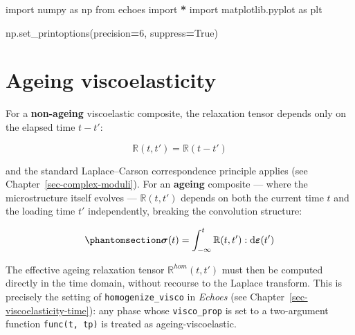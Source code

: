 \documentclass[
  a4paper,
  numbers=noendperiod,
  DIV=12]{scrreprt}
\newenvironment{Shaded}{\begin{snugshade}}{\end{snugshade}}
\newcommand{\DecValTok}[1]{\textcolor[rgb]{0.00,0.00,0.81}{#1}}
\newcommand{\ImportTok}[1]{#1}
\newcommand{\NormalTok}[1]{#1}
\newcommand{\OperatorTok}[1]{\textcolor[rgb]{0.81,0.36,0.00}{\textbf{#1}}}
\newcommand{\VariableTok}[1]{\textcolor[rgb]{0.00,0.00,0.00}{#1}}
\begin{document}
\begin{tcolorbox}[enhanced jigsaw, arc=.35mm, bottomrule=.15mm, bottomtitle=1mm, breakable, colback=white, colbacktitle=quarto-callout-tip-color!10!white, colframe=quarto-callout-tip-color-frame, coltitle=black, left=2mm, leftrule=.75mm, opacityback=0, opacitybacktitle=0.6, rightrule=.15mm, title={Imports}, titlerule=0mm, toprule=.15mm, toptitle=1mm]

\begin{Shaded}
\begin{Highlighting}[]
\ImportTok{import}\NormalTok{ numpy }\ImportTok{as}\NormalTok{ np}
\ImportTok{from}\NormalTok{ echoes }\ImportTok{import} \OperatorTok{*}
\ImportTok{import}\NormalTok{ matplotlib.pyplot }\ImportTok{as}\NormalTok{ plt}

\NormalTok{np.set\_printoptions(precision}\OperatorTok{=}\DecValTok{6}\NormalTok{, suppress}\OperatorTok{=}\VariableTok{True}\NormalTok{)}
\end{Highlighting}
\end{Shaded}

\end{tcolorbox}

\section{Ageing viscoelasticity}\label{sec-ageing-visco}

For a \textbf{non-ageing} viscoelastic composite, the relaxation tensor
depends only on the elapsed time \(t - t'\):

\[\mathbb{R}(t,t') = \mathbb{R}(t - t')\]

and the standard Laplace--Carson correspondence principle applies (see
Chapter~\ref{sec-complex-moduli}). For an \textbf{ageing} composite ---
where the microstructure itself evolves --- \(\mathbb{R}(t,t')\) depends
on both the current time \(t\) and the loading time \(t'\)
independently, breaking the convolution structure:

\begin{equation}\protect\phantomsection\label{eq-ageing-constitutive}{\boldsymbol{\sigma}(t) = \int_{-\infty}^{t} \mathbb{R}(t,t') : \mathrm{d}\boldsymbol{\varepsilon}(t')
}\end{equation}

The effective ageing relaxation tensor \(\mathbb{R}^{hom}(t,t')\) must
then be computed directly in the time domain, without recourse to the
Laplace transform. This is precisely the setting of
\texttt{homogenize\_visco} in \emph{Echoes} (see
Chapter~\ref{sec-viscoelasticity-time}): any phase whose
\texttt{visco\_prop} is set to a two-argument function
\texttt{func(t,\ tp)} is treated as ageing-viscoelastic.
\end{document}
